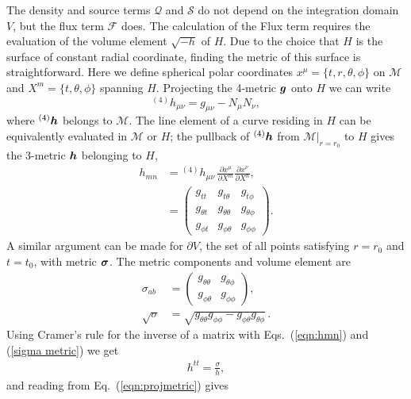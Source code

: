 The density and source terms $\mathcal{Q}$ and $\mathcal{S}$ do not depend on the integration domain $V$, but the flux term $\mathcal{F}$ does. The calculation of the Flux term requires the evaluation of the volume element $\sqrt{-h}$ of $H$. Due to the choice that $H$ is the surface of constant radial coordinate, finding the metric of this surface is straightforward. Here we define spherical polar coordinates $x^\mu = \{t,r,\theta, \phi \}$ on $\mathcal{M}$ and $X^m = \{t,\theta, \phi \}$ spanning $H$. Projecting the 4-metric $\boldsymbol g$ onto $H$ we can write
\begin{equation}
\label{eqn:projmetric}{}^{(4)}h_{\mu\nu} = g_{\mu\nu}-N_\mu N_\nu,
\end{equation}
where ${}^{(4)}\boldsymbol{h}$ belongs to $\mathcal{M}$. The line element of a curve residing in $H$ can be equivalently evaluated in $\mathcal{M}$ or $H$; the pullback of ${}^{(4)}\boldsymbol{h}$ from $\mathcal{M}\vert_{r=r_0}$ to $H$ gives the 3-metric $\boldsymbol h$ belonging to $H$,
\begin{align}
\label{induced_metric}h_{mn}  &= {}^{(4)}h_{\mu\nu}\,\frac{\partial x^\mu}{\partial X^m} \frac{\partial x^\nu}{\partial X^n}, \\
 \label{eqn:hmn}&= \begin{pmatrix} g_{tt} & g_{t\theta} & g_{t\phi} \\ g_{\theta t} &  g_{\theta\theta}& g_{\theta\phi} \\ g_{\phi t} & g_{\phi\theta} & g_{\phi\phi} \end{pmatrix}.
\end{align}
A similar argument can be made for $\partial V$, the set of all points satisfying $r=r_0$ and $t=t_0$, with metric $\boldsymbol{\sigma}$. The metric components and volume element are
\begin{align}
\label{sigma metric}\sigma_{ab} &= \begin{pmatrix} g_{\theta\theta} & g_{\theta\phi} \\ g_{\phi\theta} & g_{\phi\phi} \end{pmatrix}, \\
\label{sigma det}\sqrt{\sigma}  &= \sqrt{g_{\theta\theta}g_{\phi\phi} - g_{\phi\theta}g_{\theta\phi}}\,.
\end{align}
Using Cramer's rule for the inverse of a matrix with Eqs.~(\ref{eqn:hmn}) and (\ref{sigma metric}) we get
\begin{align}
\label{eqn:htt}h^{tt} = \frac{{\sigma}}{h},
\end{align}
and reading from Eq.~(\ref{eqn:projmetric}) gives 
